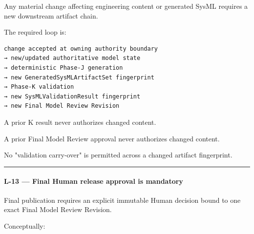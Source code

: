Any material change affecting engineering content or generated SysML requires a new downstream artifact chain.

The required loop is:

\begin{verbatim}
change accepted at owning authority boundary
→ new/updated authoritative model state
→ deterministic Phase-J generation
→ new GeneratedSysMLArtifactSet fingerprint
→ Phase-K validation
→ new SysMLValidationResult fingerprint
→ new Final Model Review Revision
\end{verbatim}

A prior K result never authorizes changed content.

A prior Final Model Review approval never authorizes changed content.

No "validation carry-over" is permitted across a changed artifact fingerprint.

\begin{center}\rule{0.5\linewidth}{0.5pt}\end{center}

\hypertarget{l-13--final-human-release-approval-is-mandatory}{%
\paragraph{L-13 --- Final Human release approval is mandatory}\label{l-13--final-human-release-approval-is-mandatory}}

Final publication requires an explicit immutable Human decision bound to one exact Final Model Review Revision.

Conceptually:

\begin{Shaded}
\begin{Highlighting}[]
\OperatorTok{=}
\OperatorTok{=}
\OperatorTok{=}\NormalTok{,}
\OperatorTok{=}
\OperatorTok{=}
\OperatorTok{=}
\OperatorTok{=}
\OperatorTok{=}
\NormalTok{)}
\end{Highlighting}
\end{Shaded}


